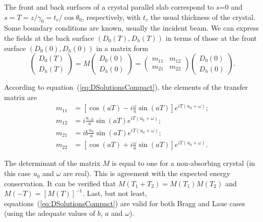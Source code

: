 \documentclass[preprint]{iucr}              %
\newcommand{\inred}[1]{{\color{red}#1}}
\begin{document}
The front and back surfaces of a crystal parallel slab correspond to $s$=0 and $s=T=z/\gamma_0=t_c/\cos\theta_0$, respectively, with $t_c$ the usual thickness of the crystal. Some boundary conditions are known, usually the incident beam.   
We can express the fields at the back surface $(D_0(T),D_h(T))$ in terms of those at the front surface $(D_0(0),D_h(0))$ in a matrix form
\begin{equation}\label{eq:Mtransfer}
    \begin{pmatrix}
    D_0(T)\\
    D_h(T)
    \end{pmatrix}
    =
    M
        \begin{pmatrix}
    D_0(0) \\
    D_h(0)
    \end{pmatrix}
    =
    \begin{pmatrix}
    m_{11} & m_{12}\\
    m_{21} & m_{22}
    \end{pmatrix}
    \begin{pmatrix}
    D_0(0) \\
    D_h(0)
    \end{pmatrix}.
\end{equation}

According to equation~(\ref{eq:DSolutionsCompact}), the elements of the transfer matrix are
\begin{subequations}\label{eq:MtransferElements}
\begin{align}
m_{11} &= \left[ \cos(aT)-i\frac{\omega}{a}\sin(aT) \right] e^{i T (u_0+\omega)};\\
m_{12} &= i \frac{u_{-h}}{a}\sin(aT) e^{i T (u_0+\omega)};\\
m_{21} &= i b \frac{u_h }{a} \sin(aT) e^{i T (u_0+\omega)};\\
m_{22} &= \left[ \cos(aT)+i \frac{\omega}{a}\sin(aT) \right] e^{i T (u_0+\omega)}.
\end{align}
\end{subequations}

The determinant of the matrix $M$ is equal to one \inred{for a non-absorbing crystal (in this case $u_0$ and $\omega$ are real)}.
This is agreement with the expected energy conservation. It can be verified that $M(T_1+T_2)=M(T_1) M(T_2)$ and $M(-T)=[M(T)]^{-1}$. Last, but not least, equations~(\ref{eq:DSolutionsCompact}) are valid for both Bragg and Laue cases (using the adequate values of $b$, $a$ and $\omega$).
\end{document}
